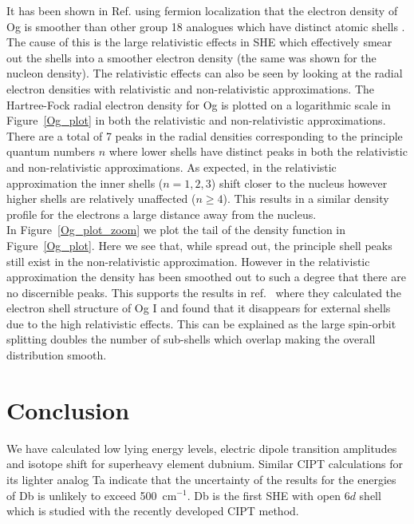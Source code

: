 \documentclass[10pt,a4paper, twoside]{report}
\begin{document}
It has been shown in Ref. \cite{Jerabek2018} using fermion localization that the electron density of Og is smoother than other group 18 analogues which have distinct atomic shells . The cause of this is the large relativistic effects in SHE which effectively smear out the shells into a smoother electron density (the same was shown for the nucleon density). The relativistic effects can also be seen by looking at the radial electron densities with relativistic and non-relativistic approximations. The Hartree-Fock radial electron density for Og is plotted on a logarithmic scale in Figure~\ref{Og_plot} in both the relativistic and non-relativistic approximations. There are a total of 7 peaks in the radial densities corresponding to the principle quantum numbers $n$ where lower shells have distinct peaks in both the relativistic and non-relativistic approximations. As expected, in the relativistic approximation the inner shells ($n=1,2,3$) shift closer to the nucleus however higher shells are relatively unaffected ($n \geq 4$). This results in a similar density profile for the electrons a large distance away from the nucleus. \\

In Figure~\ref{Og_plot_zoom} we plot the tail of the density function in Figure~\ref{Og_plot}. Here we see that, while spread out, the principle shell peaks still exist in the non-relativistic approximation. However in the relativistic approximation the density has been smoothed out to such a degree that there are no discernible peaks. This supports the results in ref.~\cite{Jerabek2018} where they calculated the electron shell structure of Og I and found that it disappears for external shells due to the high relativistic effects. This can be explained as the large spin-orbit splitting doubles the number of sub-shells which overlap making the overall distribution smooth.\\

\chapter{Conclusion} \label{chap:P2Conc}
We have calculated low lying energy levels, electric dipole transition amplitudes and isotope shift for superheavy element
dubnium. Similar CIPT calculations for its lighter analog Ta indicate that the uncertainty of the results for the energies of 
Db is unlikely to exceed 500~cm$^{-1}$. Db is the first SHE with open $6d$ shell which is studied with the recently
developed CIPT method. 
\end{document}
